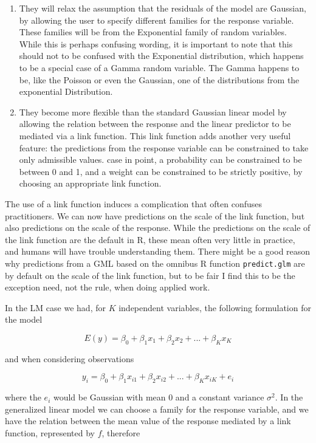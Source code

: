 \documentclass[
]{book}
\begin{document}
\begin{enumerate}
\def\labelenumi{\arabic{enumi}.}
\item
  They will relax the assumption that the residuals of the model are Gaussian, by allowing the user to specify different families for the response variable. These families will be from the Exponential family of random variables. While this is perhaps confusing wording, it is important to note that this should not to be confused with the Exponential distribution, which happens to be a special case of a Gamma random variable. The Gamma happens to be, like the Poisson or even the Gaussian, one of the distributions from the exponential Distribution.
\item
  They become more flexible than the standard Gaussian linear model by allowing the relation between the response and the linear predictor to be mediated via a link function. This link function adds another very useful feature: the predictions from the response variable can be constrained to take only admissible values. case in point, a probability can be constrained to be between 0 and 1, and a weight can be constrained to be strictly positive, by choosing an appropriate link function.
\end{enumerate}

The use of a link function induces a complication that often confuses practitioners. We can now have predictions on the scale of the link function, but also predictions on the scale of the response. While the predictions on the scale of the link function are the default in R, these mean often very little in practice, and humans will have trouble understanding them. There might be a good reason why predictions from a GML based on the omnibus R function \texttt{predict.glm} are by default on the scale of the link function, but to be fair I find this to be the exception need, not the rule, when doing applied work.

In the LM case we had, for \(K\) independent variables, the following formulation for the model

\[E(y)=\beta_0+\beta_1x_1+\beta_2x_2+...+\beta_Kx_K\]

and when considering observations

\[y_i=\beta_0+\beta_1x_{i1}+\beta_2x_{i2}+...+\beta_Kx_{iK}+e_i\]

where the \(e_i\) would be Gaussian with mean 0 and a constant variance \(\sigma^2\). In the generalized linear model we can choose a family for the response variable, and we have the relation between the mean value of the response mediated by a link function, represented by \(f\), therefore
\end{document}
